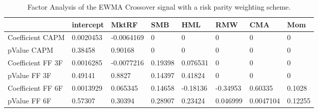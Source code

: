 \begin{table}[H]
\centering
\begin{tabular}{llllllll}
\hline& intercept & MktRF & SMB & HML & RMW & CMA & Mom \\ 
\hline 
Coefficient CAPM & 0.0020453 & -0.0064169 & 0 & 0 & 0 & 0 & 0 \\ 
pValue CAPM & 0.38458 & 0.90168 & 0 & 0 & 0 & 0 & 0 \\ 
Coefficient FF 3F & 0.0016285 & -0.0077216 & 0.19398 & 0.076531 & 0 & 0 & 0 \\ 
pValue FF 3F & 0.49141 & 0.8827 & 0.14397 & 0.41824 & 0 & 0 & 0 \\ 
Coefficient FF 6F & 0.0013929 & 0.065345 & 0.14658 & -0.18136 & -0.34953 & 0.60335 & 0.1028 \\ 
pValue FF 6F & 0.57307 & 0.30394 & 0.28907 & 0.23424 & 0.046999 & 0.0047104 & 0.12255 \\ 
\hline
\end{tabular}
\caption{Factor Analysis of the EWMA Crossover signal with a risk parity weighting scheme.}
\label{MBBSRPNR_FACTOR}
\end{table}